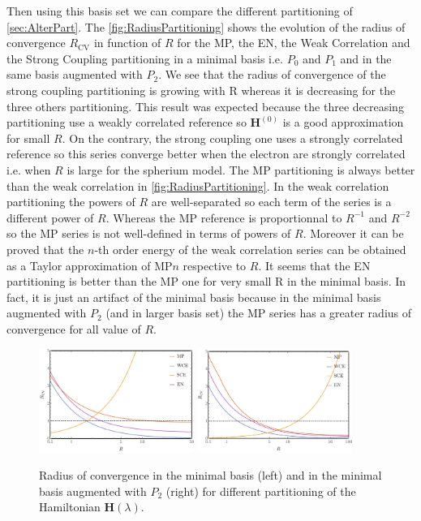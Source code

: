 \documentclass[11pt,a4paper]{article}
\newcommand{\bH}{\mathbf{H}}
\begin{document}
Then using this basis set we can compare the different partitioning of \autoref{sec:AlterPart}. The \autoref{fig:RadiusPartitioning} shows the evolution of the radius of convergence $R_{\text{CV}}$ in function of $R$ for the MP, the EN, the Weak Correlation and the Strong Coupling partitioning in a minimal basis i.e. $P_0$ and $P_1$ and in the same basis augmented with $P_2$. We see that the radius of convergence of the strong coupling partitioning is growing with R whereas it is decreasing for the three others partitioning. This result was expected because the three decreasing partitioning use a weakly correlated reference so $\bH^{(0)}$ is a good approximation for small $R$. On the contrary, the strong coupling one uses a strongly correlated reference so this series converge better when the electron are strongly correlated i.e. when $R$ is large for the spherium model.
The MP partitioning is always better than the weak correlation in \autoref{fig:RadiusPartitioning}. In the weak correlation partitioning the powers of $R$ are well-separated so each term of the series is a different power of $R$. Whereas the MP reference is proportionnal to $R^{-1}$ and $R^{-2}$ so the MP series is not well-defined in terms of powers of $R$. Moreover it can be proved that the $n$-th order energy of the weak correlation series can be obtained as a  Taylor approximation of MP$n$ respective to $R$. It seems that the EN partitioning is better than the MP one for very small R in the minimal basis. In fact, it is just an artifact of the minimal basis because in the minimal basis augmented with $P_2
$ (and in larger basis set) the MP series has a greater radius of convergence for all value of $R$.

\begin{figure}[h!]
    \centering
    \includegraphics[width=0.45\textwidth]{PartitioningRCV2.pdf}
    \includegraphics[width=0.45\textwidth]{PartitioningRCV3.pdf}
    \caption{\centering Radius of convergence in the minimal basis (left) and in the minimal basis augmented with $P_2$ (right) for different partitioning of the Hamiltonian $\bH(\lambda)$.}
    \label{fig:RadiusPartitioning}
\end{figure}
\end{document}

